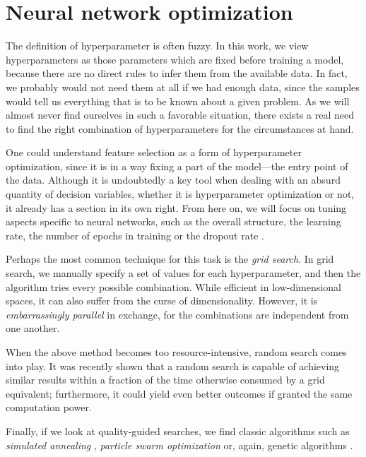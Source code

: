 \chapter{Neural network optimization}\label{ch:optimization}

The definition of hyperparameter is often fuzzy. In this work, we view hyperparameters as those parameters which are fixed before training a model, because there are no direct rules to infer them from the available data. In fact, we probably would not need them at all if we had enough data, since the samples would tell us everything that is to be known about a given problem. As we will almost never find ourselves in such a favorable situation, there exists a real need to find the right combination of hyperparameters for the circumstances at hand.

One could understand feature selection as a form of hyperparameter optimization, since it is in a way fixing a part of the model---the entry point of the data. Although it is undoubtedly a key tool when dealing with an absurd quantity of decision variables, whether it is hyperparameter optimization or not, it already has a section in its own right. From here on, we will focus on tuning aspects specific to neural networks, such as the overall structure, the learning rate, the number of epochs in training or the dropout rate \cite{srivastava2014dropout}.

Perhaps the most common technique for this task is the \textit{grid search}. In grid search, we manually specify a set of values for each hyperparameter, and then the algorithm tries every possible combination. While efficient in low-dimensional spaces, it can also suffer from the curse of dimensionality. However, it is \textit{embarrassingly parallel} in exchange, for the combinations are independent from one another.

When the above method becomes too resource-intensive, random search \cite{bergstra2012random} comes into play. It was recently shown that a random search is capable of achieving similar results within a fraction of the time otherwise consumed by a grid equivalent; furthermore, it could yield even better outcomes if granted the same computation power.

Finally, if we look at quality-guided searches, we find classic algorithms such as \textit{simulated annealing} \cite{pai2005support}, \textit{particle swarm optimization} \cite{lin2008particle} or, again, genetic algorithms \cite{leung2003tuning}.

